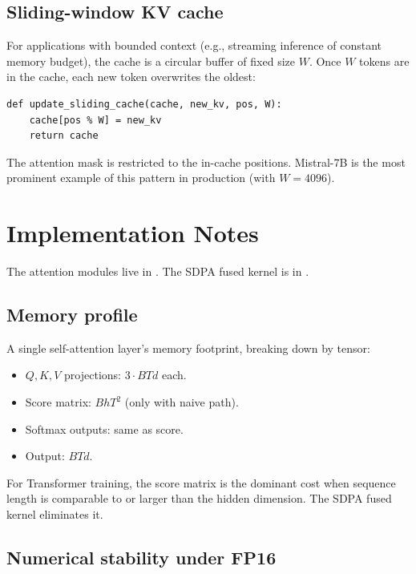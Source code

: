 \subsection{Sliding-window KV cache}
\label{ssec:attention:sliding_window_kv}

For applications with bounded context (e.g., streaming
inference of constant memory budget), the cache is a circular
buffer of fixed size $W$. Once $W$ tokens are in the cache,
each new token overwrites the oldest:

\begin{lstlisting}[style=lucid,language=LucidPython]
def update_sliding_cache(cache, new_kv, pos, W):
    cache[pos % W] = new_kv
    return cache
\end{lstlisting}

The attention mask is restricted to the in-cache positions.
Mistral-7B is the most prominent example of this pattern in
production (with $W = 4096$).

\section{Implementation Notes}
\label{sec:attention:impl_notes}

The attention modules live in .
The SDPA fused kernel is in .

\subsection{Memory profile}
\label{ssec:attention:memory_profile}

A single self-attention layer's memory footprint, breaking down
by tensor:
\begin{itemize}
  \item $Q, K, V$ projections: $3 \cdot B T d$ each.
  \item Score matrix: $B h T^2$ (only with naive path).
  \item Softmax outputs: same as score.
  \item Output: $B T d$.
\end{itemize}

For Transformer training, the score matrix is the dominant cost
when sequence length is comparable to or larger than the hidden
dimension. The SDPA fused kernel eliminates it.

\subsection{Numerical stability under FP16}
\label{ssec:attention:fp16_stability}

